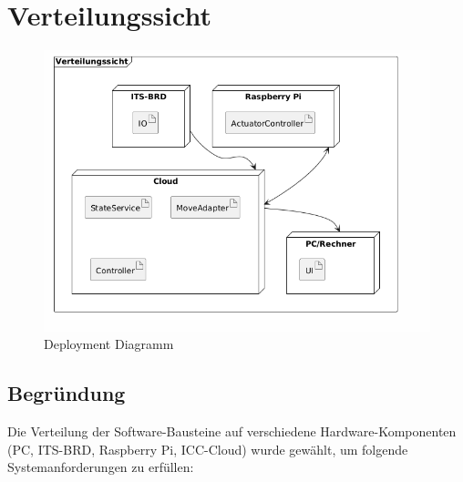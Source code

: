 \chapter{Verteilungssicht}
\begin{figure}[h!]
	\centering
	\includegraphics[scale=.5]{diagrams/deploymentView.png}
	\caption{Deployment Diagramm}
	\label{fig:deployment-prod-grafik}
\end{figure}

\section{Begründung}

Die Verteilung der Software-Bausteine auf verschiedene Hardware-Komponenten (PC, ITS-BRD, Raspberry Pi, ICC-Cloud) wurde gewählt, um folgende Systemanforderungen zu erfüllen:

\begin{itemize}
\end{itemize}

